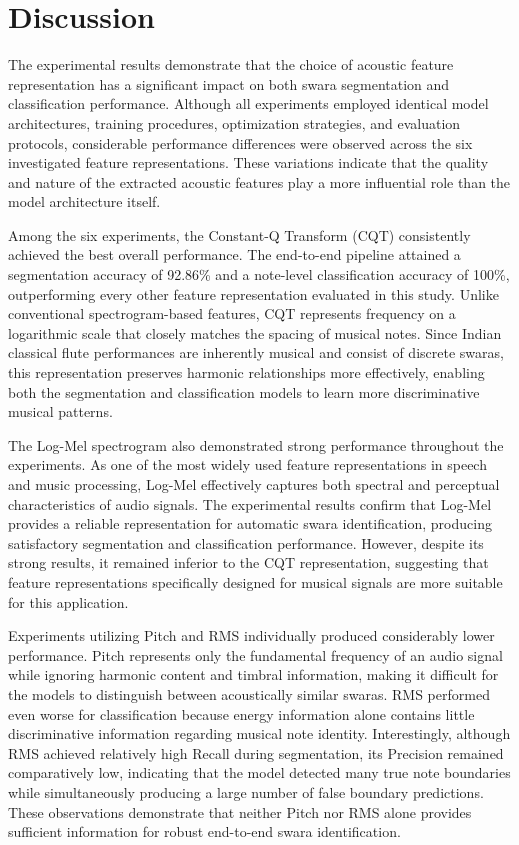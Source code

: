 \section{Discussion}

The experimental results demonstrate that the choice of acoustic feature representation has a significant impact on both swara segmentation and classification performance. Although all experiments employed identical model architectures, training procedures, optimization strategies, and evaluation protocols, considerable performance differences were observed across the six investigated feature representations. These variations indicate that the quality and nature of the extracted acoustic features play a more influential role than the model architecture itself.

Among the six experiments, the Constant-Q Transform (CQT) consistently achieved the best overall performance. The end-to-end pipeline attained a segmentation accuracy of 92.86\% and a note-level classification accuracy of 100\%, outperforming every other feature representation evaluated in this study. Unlike conventional spectrogram-based features, CQT represents frequency on a logarithmic scale that closely matches the spacing of musical notes. Since Indian classical flute performances are inherently musical and consist of discrete swaras, this representation preserves harmonic relationships more effectively, enabling both the segmentation and classification models to learn more discriminative musical patterns.

The Log-Mel spectrogram also demonstrated strong performance throughout the experiments. As one of the most widely used feature representations in speech and music processing, Log-Mel effectively captures both spectral and perceptual characteristics of audio signals. The experimental results confirm that Log-Mel provides a reliable representation for automatic swara identification, producing satisfactory segmentation and classification performance. However, despite its strong results, it remained inferior to the CQT representation, suggesting that feature representations specifically designed for musical signals are more suitable for this application.

Experiments utilizing Pitch and RMS individually produced considerably lower performance. Pitch represents only the fundamental frequency of an audio signal while ignoring harmonic content and timbral information, making it difficult for the models to distinguish between acoustically similar swaras. RMS performed even worse for classification because energy information alone contains little discriminative information regarding musical note identity. Interestingly, although RMS achieved relatively high Recall during segmentation, its Precision remained comparatively low, indicating that the model detected many true note boundaries while simultaneously producing a large number of false boundary predictions. These observations demonstrate that neither Pitch nor RMS alone provides sufficient information for robust end-to-end swara identification.

